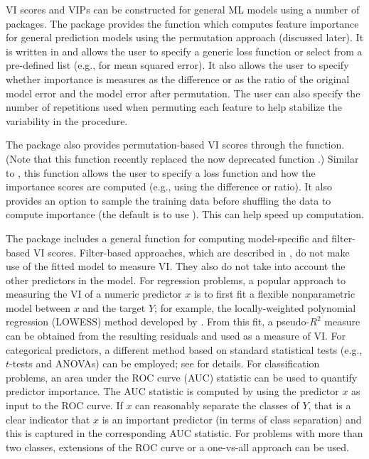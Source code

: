 VI scores and VIPs can be constructed for general ML models using a number of packages. The  package \citep{iml-pkg} provides the  function which computes feature importance for general prediction models using the permutation approach (discussed later). It is written in  \citep{R6-pkg} and allows the user to specify a generic loss function or select from a pre-defined list (e.g.,  for mean squared error). It also allows the user to specify whether importance is measures as the difference or as the ratio of the original model error and the model error after permutation. The user can also specify the number of repetitions used when permuting each feature to help stabilize the variability in the procedure.

The  package \citep{ingredients-pkg} also provides permutation-based VI scores through the  function. (Note that this function recently replaced the now deprecated  function  \citep{DALEX-pkg}.) Similar to , this function allows the user to specify a loss function and how the importance scores are computed (e.g., using the difference or ratio). It also provides an option to sample the training data before shuffling the data to compute importance (the default is to use ). This can help speed up computation.

The  package \citep{caret-pkg} includes a general  function for computing model-specific and filter-based VI scores. Filter-based approaches, which are described in \citet{applied-kuhn-2013}, do not make use of the fitted model to measure VI. They also do not take into account the other predictors in the model. For regression problems, a popular approach to measuring the VI of a numeric predictor $x$ is to first fit a flexible nonparametric model between $x$ and the target $Y$; for example, the locally-weighted polynomial regression (LOWESS) method developed by \citet{robust-cleveland-1979}. From this fit, a pseudo-$R^2$ measure can be obtained from the resulting residuals and used as a measure of VI. For categorical predictors, a different method based on standard statistical tests (e.g., $t$-tests and ANOVAs) can be employed; see \citet{applied-kuhn-2013} for details. For classification problems, an area under the ROC curve (AUC) statistic can be used to quantify predictor importance. The AUC statistic is computed by using the predictor $x$ as input to the ROC curve. If $x$ can reasonably separate the classes of $Y$, that is a clear indicator that $x$ is an important predictor (in terms of class separation) and this is captured in the corresponding AUC statistic. For problems with more than two classes, extensions of the ROC curve or a one-vs-all approach can be used.

